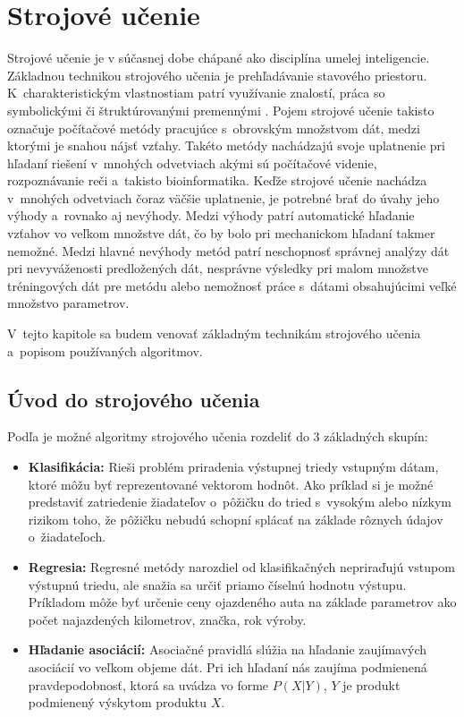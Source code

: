 \chapter{Strojové učenie}
\label{ml}
Strojové učenie je v súčasnej dobe chápané ako disciplína umelej inteligencie. Základnou technikou strojového učenia je prehľadávanie stavového priestoru. K~charakteristickým vlastnostiam patrí využívanie znalostí, práca so symbolickými či štruktúrovanými premennými \cite{machine_learning}. Pojem strojové učenie takisto označuje počítačové metódy pracujúce s~obrovským množstvom dát, medzi ktorými je snahou nájsť vzťahy. Takéto metódy nachádzajú svoje uplatnenie pri hľadaní riešení v~mnohých odvetviach akými sú počítačové videnie, rozpoznávanie reči a~takisto bioinformatika. Keďže strojové učenie nachádza v~mnohých odvetviach čoraz väčšie uplatnenie, je potrebné brať do úvahy jeho výhody a~rovnako aj nevýhody. Medzi výhody patrí automatické hľadanie vzťahov vo veľkom množstve dát, čo by bolo pri mechanickom hľadaní takmer nemožné. Medzi hlavné nevýhody metód patrí neschopnosť správnej analýzy dát pri nevyváženosti predložených dát, nesprávne výsledky pri malom množstve tréningových dát pre metódu alebo nemožnosť práce s~dátami obsahujúcimi veľké množstvo parametrov.

V~tejto kapitole sa budem venovať základným technikám strojového učenia a~popisom používaných algoritmov. 

\section{Úvod do strojového učenia}

Podľa \cite{alpaydin} je možné algoritmy strojového učenia rozdeliť do 3 základných skupín:
\begin{itemize}
	\item \textbf{Klasifikácia:} Rieši problém priradenia výstupnej triedy vstupným dátam, ktoré môžu byť reprezentované vektorom hodnôt. Ako príklad si je možné predstaviť zatriedenie žiadateľov o~pôžičku do tried s~vysokým alebo nízkym rizikom toho, že pôžičku nebudú schopní splácať na základe rôznych údajov o~žiadateľoch.
	\item \textbf{Regresia:} Regresné metódy narozdiel od klasifikačných nepriraďujú vstupom výstupnú triedu, ale snažia sa určiť priamo číselnú hodnotu výstupu. Príkladom môže byť určenie ceny ojazdeného auta na základe parametrov ako počet najazdených kilometrov, značka, rok výroby.
	\item \textbf{Hľadanie asociácií:} Asociačné pravidlá slúžia na hľadanie zaujímavých asociácií vo veľkom objeme dát. Pri ich hľadaní nás zaujíma podmienená pravdepodobnosť, ktorá sa uvádza vo forme $P(X|Y)$, $Y$ je produkt podmienený výskytom produktu $X$. 
\end{itemize}

